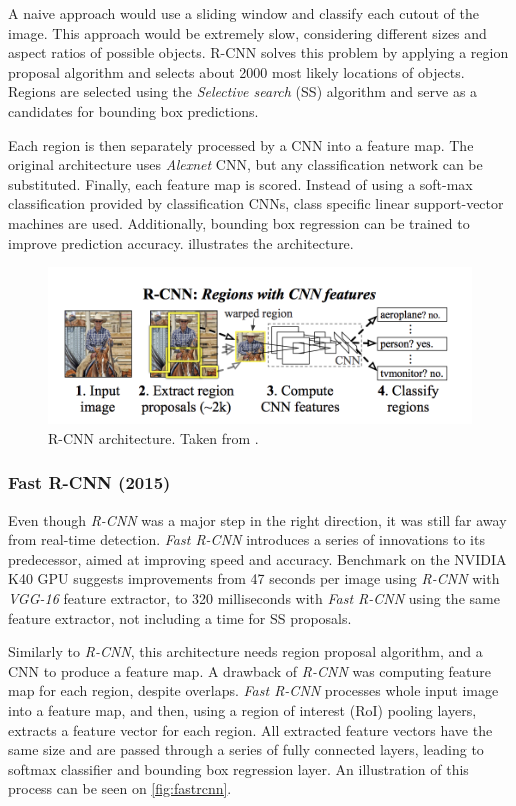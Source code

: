 A naive approach would use a sliding window and classify each cutout of the image.  This approach would be extremely slow, considering different sizes and aspect ratios of possible objects. R-CNN solves this problem by applying a region proposal algorithm and selects about 2000 most likely locations of objects. Regions are selected using the \textit{Selective search} (SS) \cite{bib:selectivesearch} algorithm and serve as a candidates for bounding box predictions.

Each region is then separately processed by a CNN into a feature map. The original architecture uses \textit{Alexnet} CNN, but any classification network can be substituted. Finally, each feature map is scored. Instead of using a soft-max classification provided by classification CNNs, class specific linear support-vector machines are used. Additionally, bounding box regression can be trained to improve prediction accuracy.  illustrates the architecture.

\begin{figure}
    \centering
    \includegraphics[width=\textwidth]{img/rcnn}
    \caption{R-CNN architecture. Taken from \cite[fig. 1]{bib:rcnn}.}
    \label{fig:rcnn}
\end{figure}

\subsubsection{Fast R-CNN (2015)}
Even though \textit{R-CNN} was a major step in the right direction, it was still far away from real-time detection. \textit{Fast R-CNN} \cite{bib:fastrcnn} introduces a series of innovations to its predecessor, aimed at improving speed and accuracy. Benchmark on the NVIDIA K40 GPU suggests improvements from 47 seconds per image using \textit{R-CNN} with \textit{VGG-16} feature extractor, to 320 milliseconds with \textit{Fast R-CNN} using the same feature extractor, not including a time for SS proposals. 

Similarly to \textit{R-CNN}, this architecture needs region proposal algorithm, and a CNN to produce a feature map. A drawback of \textit{R-CNN} was computing feature map for each region, despite overlaps. \textit{Fast R-CNN} processes whole input image into a feature map, and then, using a region of interest (RoI) pooling layers, extracts a feature vector for each region. All extracted feature vectors have the same size and are passed through a series of fully connected layers, leading to softmax classifier and bounding box regression layer. An illustration of this process can be seen on \cref{fig:fastrcnn}.

